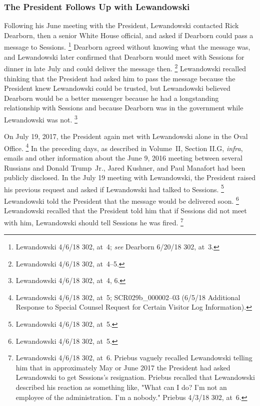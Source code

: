 {\subsubsection{The President Follows Up with Lewandowski}

Following his June meeting with the President, Lewandowski contacted Rick Dearborn, then a senior White House official, and asked if Dearborn could pass a message to Sessions.%
\footnote{Lewandowski 4/6/18 302, at~4;
\textit{see} Dearborn 6/20/18 302, at~3.}
Dearborn agreed without knowing what the message was, and Lewandowski later confirmed that Dearborn would meet with Sessions for dinner in late July and could deliver the message then.%
\footnote{Lewandowski 4/6/18 302, at~4--5.}
Lewandowski recalled thinking that the President had asked him to pass the message because the President knew Lewandowski could be trusted, but Lewandowski believed Dearborn would be a better messenger because he had a longstanding relationship with Sessions and because Dearborn was in the government while Lewandowski was not.%
\footnote{Lewandowski 4/6/18 302, at~4, 6.}

On July 19, 2017, the President again met with Lewandowski alone in the Oval Office.%
\footnote{Lewandowski 4/6/18 302, at~5;
SCR029b\_000002--03 (6/5/18 Additional Response to Special Counsel Request for Certain Visitor Log Information).}
In the preceding days, as described in Volume~II, Section II.G, \textit{infra}, emails and other information about the June 9, 2016 meeting between several Russians and Donald Trump~Jr., Jared Kushner, and Paul Manafort had been publicly disclosed.
In the July 19 meeting with Lewandowski, the President raised his previous request and asked if Lewandowski had talked to Sessions.%
\footnote{Lewandowski 4/6/18 302, at~5.}
Lewandowski told the President that the message would be delivered soon.%
\footnote{Lewandowski 4/6/18 302, at~5.}
Lewandowski recalled that the President told him that if Sessions did not meet with him, Lewandowski should tell Sessions he was fired.%
\footnote{Lewandowski 4/6/18 302, at~6.
Priebus vaguely recalled Lewandowski telling him that in approximately May or June 2017 the President had asked Lewandowski to get Sessions's resignation.
Priebus recalled that Lewandowski described his reaction as something like, "What can I do?
I'm not an employee of the administration.
I'm a nobody."
Priebus 4/3/18 302, at~6.}

}
